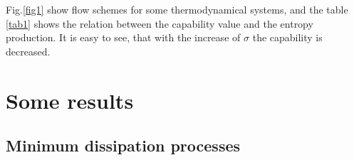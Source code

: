 \documentclass[epjST]{svjour}
\begin{document}
Fig.\ref{fig1} show flow schemes for some thermodynamical systems, and the table \ref{tab1} shows the relation between the capability value and the entropy production. It is easy to see, that with the increase of $\sigma$ the capability is decreased.

\section{Some results}

\subsection*{Minimum dissipation processes}
%
%
\end{document}
